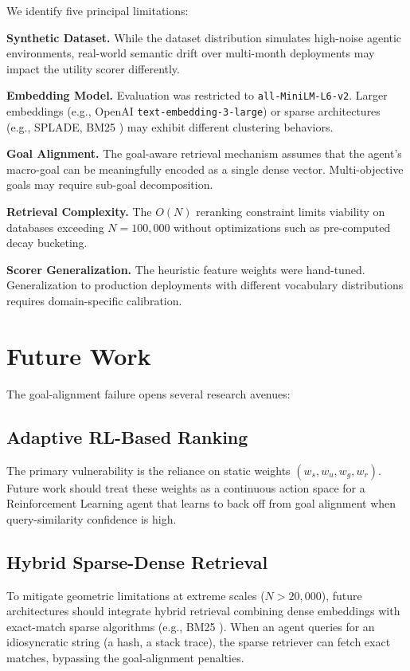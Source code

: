 \documentclass[conference]{IEEEtran}
\begin{document}
We identify five principal limitations:

\textbf{Synthetic Dataset.} While the dataset distribution simulates high-noise agentic environments, real-world semantic drift over multi-month deployments may impact the utility scorer differently.

\textbf{Embedding Model.} Evaluation was restricted to \texttt{all-MiniLM-L6-v2}. Larger embeddings (e.g., OpenAI \texttt{text-embedding-3-large}) or sparse architectures (e.g., SPLADE, BM25 \cite{robertson2009bm25}) may exhibit different clustering behaviors.

\textbf{Goal Alignment.} The goal-aware retrieval mechanism assumes that the agent's macro-goal can be meaningfully encoded as a single dense vector. Multi-objective goals may require sub-goal decomposition.

\textbf{Retrieval Complexity.} The $O(N)$ reranking constraint limits viability on databases exceeding $N{=}100{,}000$ without optimizations such as pre-computed decay bucketing.

\textbf{Scorer Generalization.} The heuristic feature weights were hand-tuned. Generalization to production deployments with different vocabulary distributions requires domain-specific calibration.

\section{Future Work}
\label{sec:future}

The goal-alignment failure opens several research avenues:

\subsection{Adaptive RL-Based Ranking}
The primary vulnerability is the reliance on static weights $(w_s, w_u, w_g, w_r)$. Future work should treat these weights as a continuous action space for a Reinforcement Learning agent \cite{shinn2023reflexion} that learns to back off from goal alignment when query-similarity confidence is high.

\subsection{Hybrid Sparse-Dense Retrieval}
To mitigate geometric limitations at extreme scales ($N{>}20{,}000$), future architectures should integrate hybrid retrieval combining dense embeddings with exact-match sparse algorithms (e.g., BM25 \cite{robertson2009bm25}). When an agent queries for an idiosyncratic string (a hash, a stack trace), the sparse retriever can fetch exact matches, bypassing the goal-alignment penalties.
\end{document}
